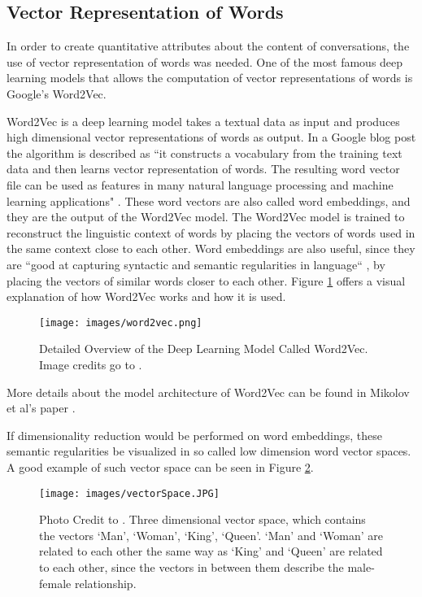 \documentclass[11pt]{article}
\begin{document}

\subsection{Vector Representation of Words}
In order to create quantitative attributes about the content of conversations, the use of vector representation of words was needed. One of the most famous deep learning models that allows the computation of vector representations of words is Google's Word2Vec.

Word2Vec is a deep learning model takes a textual data as input and produces high dimensional vector representations of words as output. In a Google blog post the algorithm is described as ``it constructs a vocabulary from the training text data and then learns vector representation of words. The resulting word vector file can be used as features in many natural language processing and machine learning applications" \cite{mikolov_2013}. 
These word vectors are also called word embeddings, and they are the output of the Word2Vec model. The Word2Vec model is trained to reconstruct the linguistic context of words by placing the vectors of words used in the same context close to each other. Word embeddings are also useful, since they are ``good at capturing syntactic and semantic regularities in language`` \cite{mikolov2013linguistic}, by placing the vectors of similar words closer to each other. Figure \ref{fig:word2vec} offers a visual explanation of how Word2Vec works and how it is used.

\begin{figure}[h!]
    \centering
    \texttt{[image: images/word2vec.png]}
    \caption{Detailed Overview of the Deep Learning Model Called Word2Vec. Image credits go to \cite{Kevin2015}.}
    \label{fig:word2vec}
\end{figure}

More details about the model architecture of Word2Vec can be found in Mikolov et al's paper \cite{mikolov2013efficient}.

If dimensionality reduction would be performed on word embeddings, these semantic regularities be visualized in so called low dimension word vector spaces. A good example of such vector space can be seen in Figure \ref{fig:vectorSpace}.

\begin{figure}[h!]
    \centering
    \texttt{[image: images/vectorSpace.JPG]}
    \caption{Photo Credit to \cite{Vidhya}. Three dimensional vector space, which contains the vectors `Man', `Woman', `King', `Queen'. `Man' and `Woman' are related to each other the same way as `King' and `Queen' are related to each other, since the vectors in between them describe the male-female relationship.}
    \label{fig:vectorSpace}
\end{figure}
\end{document}
